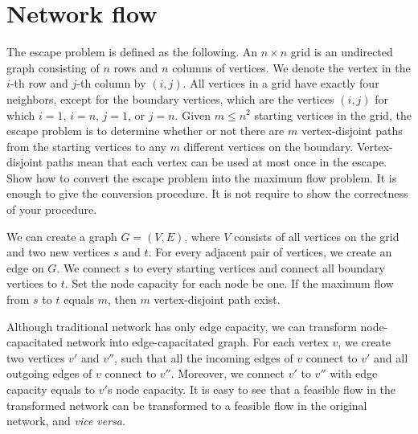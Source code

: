 \section{Network flow}
\begin{Exercise}[origin={NTU CSIE 100}]
The escape problem is defined as the following. An $n \times n$ grid is an undirected graph consisting of $n$ rows and $n$ columns of vertices. We denote the vertex in the $i$-th row and $j$-th column by $(i, j)$. All vertices in a grid have exactly four neighbors, except for the boundary vertices, which are the vertices $(i, j)$ for which $i = 1$, $i = n$, $j = 1$, or $j = n$. Given $m \leq n^2$ starting vertices in the grid, the escape problem is to determine whether or not there are $m$ vertex-disjoint paths from the starting vertices to any $m$ different vertices on the boundary. Vertex-disjoint paths mean that each vertex can be used at most once in the escape. Show how to convert the escape problem into the maximum flow problem. It is enough to give the conversion procedure. It is not require to show the correctness of your procedure.
\end{Exercise}
\begin{Answer}
We can create a graph $G = (V, E)$, where $V$ consists of all vertices on the grid and two new vertices $s$ and $t$. For every adjacent pair of vertices, we create an edge on $G$. We connect $s$ to every starting vertices and connect all boundary vertices to $t$. Set the node capacity for each node be one. If the maximum flow from $s$ to $t$ equals $m$, then $m$ vertex-disjoint path exist.

Although traditional network has only edge capacity, we can transform node-capacitated network into edge-capacitated graph. For each vertex $v$, we create two vertices $v'$ and $v''$, such that all the incoming edges of $v$ connect to $v'$ and all outgoing edges of $v$ connect to $v''$. Moreover, we connect $v'$ to $v''$ with edge capacity equals to $v'$s node capacity. It is easy to see that a feasible flow in the transformed network can be transformed to a feasible flow in the original network, and \textit{vice versa}.
\end{Answer}
%


